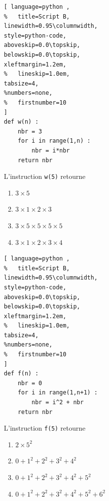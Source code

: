 \documentclass[main.tex]{subfiles}
\begin{document}
\begin{exercise}
\noindent
\begin{minipage}{0.38\linewidth} 
\begin{lstlisting}[ language=python , 
%	title=Script B,   
linewidth=0.95\columnwidth,
style=python-code,    
aboveskip=0.0\topskip,
belowskip=0.0\topskip,
xleftmargin=1.2em,
%	lineskip=1.0em,
tabsize=4, 
%numbers=none,
%	firstnumber=10  
] 
def w(n) :
	nbr = 3
	for i in range(1,n) :
		nbr = i*nbr
	return nbr
\end{lstlisting} 
\end{minipage} 
\hfill 
\parbox{0.6\linewidth}{
L'instruction \lstinline|w(5)| retourne \dotfill 
\begin{enumerate}[label=\ding{111}, leftmargin=*] 
\item $3\times 5$ 
\item $3\times 1 \times 2 \times 3  $ 
\item $3\times 5 \times 5 \times 5 \times 5  $ 
\item $3\times 1 \times 2 \times 3 \times 4$ 
\end{enumerate}
}

\noindent
\begin{minipage}{0.38\linewidth} 
\begin{lstlisting}[ language=python , 
%	title=Script B,   
linewidth=0.95\columnwidth,
style=python-code,    
aboveskip=0.0\topskip,
belowskip=0.0\topskip,
xleftmargin=1.2em,
%	lineskip=1.0em,
tabsize=4, 
%numbers=none,
%	firstnumber=10  
] 
def f(n) :
	nbr = 0
	for i in range(1,n+1) :
		nbr = i^2 + nbr
	return nbr
\end{lstlisting} 
\end{minipage} 
\hfill 
\parbox{0.6\linewidth}{
L'instruction \lstinline|f(5)| retourne \dotfill 
\begin{enumerate}[label=\ding{111}, leftmargin=*] 
\item $2 \times 5^2$ 
\item $0+ 1^2 +2^2+3^2+4^2  $ 
\item $0+ 1^2 +2^2+3^2+4^2 + 5^2 $ 
\item $0+ 1^2 +2^2+3^2+4^2 + 5^2 + 6^2$ 
\end{enumerate}
} 
\end{exercise}
\end{document}
